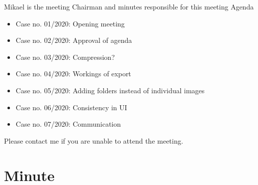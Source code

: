 \documentclass{article}
\begin{document}
Mikael is the meeting Chairman and minutes responsible for this meeting
\newline
\newline
\large Agenda 
\begin{itemize}
    \item Case no. 01/2020:  Opening meeting
    \item Case no. 02/2020:  Approval of agenda
    \item Case no. 03/2020:  Compression?
    \item Case no. 04/2020:  Workings of export
    \item Case no. 05/2020:  Adding folders instead of individual images
    \item Case no. 06/2020:  Consistency in UI
    \item Case no. 07/2020:  Communication
\end{itemize}
\newline
\newline
Please contact me if you are unable to attend the meeting.






\newpage
\section{Minute}
\end{document}
